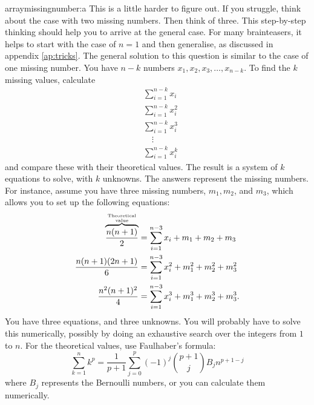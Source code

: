 \begin{subanswer}{arraymissingnumber:a}
This is a little harder to figure out.
If you struggle, think about the case with two missing numbers.
Then think of three.
This step-by-step thinking should help you to arrive at the general case.
For many brainteasers, it helps to start with the case of $n=1$ and then generalise, as discussed in appendix \ref{ap:tricks}.
The general solution to this question is similar to the case of one missing number.
You have $n-k$ numbers $x_1, x_2, x_3, \ldots , x_{n-k}$.
To find the $k$ missing values, calculate
\begin{align*}
& \sum_{i=1}^{n-k}{ x_i   } \\
& \sum_{i=1}^{n-k}{ x_i^2 } \\
& \sum_{i=1}^{n-k}{ x_i^3 } \\
& \quad\vdots \\
& \sum_{i=1}^{n-k}{ x_i^k }
\end{align*}
and compare these with their theoretical values.
The result is a system of $k$ equations to solve, with $k$ unknowns.
The answers represent the missing numbers.
For instance, assume you have three missing numbers, $m_1, m_2$, and $m_3$, which allows you to set up the following equations:
\begin{align*}
 \overbrace{\frac{n(n+1)}{2}}^{ \text{Theoretical} \atop \text{value} }
 &=
 \sum_{i=1}^{n-3}{ x_i }
+  m_1 + m_2 + m_3
\\
 \frac{n(n+1)(2n + 1)}{6}
 &=
 \sum_{i=1}^{n-3}{ x_i^2 }
+ m_1^2 + m_2^2 + m_3^2
\\
 \frac{n^2(n+1)^2}{4}
 &=
 \sum_{i=1}^{n-3}{ x_i^3 }
+ m_1^3 + m_2^3 + m_3^3
\text{.}
\end{align*}
You have three equations, and three unknowns.
You will probably have to solve this numerically, possibly by doing an exhaustive search over the integers from $1$ to $n$.
For the theoretical values, use Faulhaber's formula:
\[
  \sum_{k=1}^{n}{k^p} = \frac{1}{p+1} \sum_{j=0}^{p}{ (-1)^j \binom{p+1}{j} B_j n^{p+1-j} }
\]
where $B_j$ represents the Bernoulli numbers, or you can calculate them numerically.


\end{subanswer}




